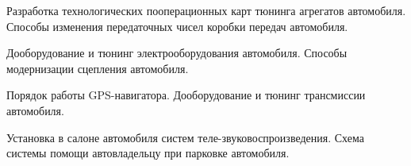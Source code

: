 \documentclass[
	14pt,
	a4paper,
	]
	{scrartcl}
\begin{document}
\vfill

\newpage


\shapk
{}
\setcounter{zad}{0}

\vfill
\z Разработка технологических пооперационных карт тюнинга агрегатов автомобиля.
 \vfill
\z Способы изменения передаточных чисел коробки передач автомобиля.
 \vfill

\vfill

\newpage


\shapk
{}
\setcounter{zad}{0}

\vfill
\z Дооборудование и тюнинг электрооборудования автомобиля.
 \vfill
\z Способы модернизации сцепления автомобиля.
 \vfill

\vfill

\newpage


\shapk
{}
\setcounter{zad}{0}

\vfill
\z Порядок работы GPS-навигатора.
 \vfill
\z Дооборудование и тюнинг трансмиссии автомобиля.
 \vfill

\vfill

\newpage


\shapk
{}
\setcounter{zad}{0}

\vfill
\z Установка в салоне автомобиля систем теле-звуковоспроизведения.
 \vfill
\z Схема системы помощи автовладельцу при парковке автомобиля.
 \vfill

\vfill

\newpage
\end{document}
